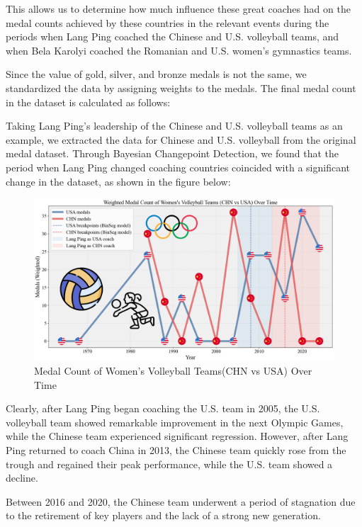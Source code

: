 \documentclass[12pt]{article}  %
\begin{document}
This allows us to determine how much influence these great coaches had on the medal counts achieved by these countries in the relevant events during the periods when Lang Ping coached the Chinese and U.S. volleyball teams, and when Bela Karolyi coached the Romanian and U.S. women's gymnastics teams.

Since the value of gold, silver, and bronze medals is not the same, we standardized the data by assigning weights to the medals. The final medal count in the dataset is calculated as follows: 







Taking Lang Ping's leadership of the Chinese and U.S. volleyball teams as an example, we extracted the data for Chinese and U.S. volleyball from the original medal dataset. Through Bayesian Changepoint Detection, we found that the period when Lang Ping changed coaching countries coincided with a significant change in the dataset, as shown in the figure below:



\begin{figure}[htbp]
	\centering
	\includegraphics[width=12cm]{img/Volleyball.png}
	\caption{Medal Count of Women's Volleyball Teams(CHN vs USA) Over Time}
	\label{fig:aa}
\end{figure}
Clearly, after Lang Ping began coaching the U.S. team in 2005, the U.S. volleyball team showed remarkable improvement in the next Olympic Games, while the Chinese team experienced significant regression. However, after Lang Ping returned to coach China in 2013, the Chinese team quickly rose from the trough and regained their peak performance, while the U.S. team showed a decline.

Between 2016 and 2020, the Chinese team underwent a period of stagnation due to the retirement of key players and the lack of a strong new generation.
\end{document}
